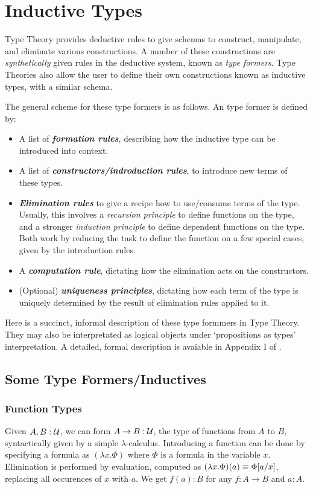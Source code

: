 \section{Inductive Types}
Type Theory provides deductive rules to give schemas to construct, manipulate, and
eliminate various constructions. A number of these
constructions are \textit{synthetically} given rules in the deductive system, known as \textit{type formers}.
Type Theories also allow the user to define their own constructions known as inductive types,
with a similar schema.

The general scheme for these type formers is as follows. An type former is defined by:
\begin{itemize}
  \item A list of \textbf{\textit{formation rules}}, describing how the inductive type can be
    introduced into context.
\item A list of \textbf{\textit{constructors/indroduction rules}}, to introduce new terms of these types.
\item \textbf{\textit{Elimination rules}} to give a recipe how to use/consume terms of the type. 
    Usually, this involves a \textit{recursion principle} to define functions on the type, and a
    stronger \textit{induction principle} to define dependent functions on the type.
    Both work by reducing the task to define the function on a few special cases, given by the introduction rules.
\item A \textbf{\textit{computation rule}}, dictating how the elimination acts on the constructors. 
\item (Optional) \textbf{\textit{uniqueness principles}}, dictating how each term of the type
  is uniquely determined by the result of elimination rules applied to it.
\end{itemize}

Here is a succinct, informal description of these type formmers in Type Theory. They may also be interpretated as logical objects 
under `propositions as types' interpretation. A detailed, formal description
is avaiable in Appendix I of \cite{HoTT}.

\subsection{Some Type Formers/Inductives}
\subsubsection{Function Types}
Given $A, B : \mathcal{U}$, we can form $A \to B : \mathcal{U}$, the type of functions from $A$ to $B$,
syntactically given by a simple $\lambda$-calculus. Introducing a function can be done by specifying a 
formula as $(\lambda x.\Phi)$ where $\Phi$ is a formula in the variable $x$. Elimination is performed by
evaluation, computed as $(\lambda x.\Phi)(a) \equiv \Phi[a/x]$, replacing all occurences of $x$ with $a$.
We get $f(a) : B$ for any $f : A \to B$ and $a : A$.

